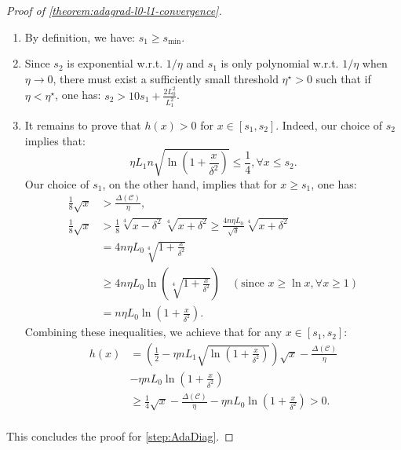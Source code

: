 \documentclass{article}
\theoremstyle{plain}
\theoremstyle{definition}
\theoremstyle{remark}
\begin{document}
\begin{proof}[Proof of \cref{theorem:adagrad-l0-l1-convergence}]
    \begin{enumerate}[leftmargin=*]
        \item By definition, we have: $s_1 \geq s_{\min}$.
        \item Since $s_2$ is exponential w.r.t. $1/\eta$ and $s_1$ is only polynomial w.r.t. $1/\eta$ when $\eta \to 0$, there must exist a sufficiently small threshold $\eta^\star > 0$ such that if $\eta < \eta^\star$, one has: $s_2 > 10 s_1 + \frac{2L_0^2}{L_1^2}$.
        \item It remains to prove that $h(x) > 0$ for $x \in [s_1, s_2]$. Indeed, our choice of $s_2$ implies that:
        \begin{equation*}
            \eta L_1 n \sqrt{\ln\left(1 + \frac{x}{\delta^2}\right)} \leq \frac{1}{4}, \forall x \leq s_2.
        \end{equation*} 
        Our choice of $s_1$, on the other hand, implies that for $x \geq s_1$, one has:
        \begin{equation*}
            \begin{aligned}
                \frac{1}{8}\sqrt{x} &> \frac{\Delta(\mathcal{C})}{\eta},\\
                \frac{1}{8}\sqrt{x} &> \frac{1}{8}\sqrt[4]{x - \delta^2}\sqrt[4]{x + \delta^2} \geq \frac{4n\eta L_0}{\sqrt{\delta}}\sqrt[4]{x + \delta^2}\\
                &= 4n\eta L_0 \sqrt[4]{1 + \frac{x}{\delta^2}}\\
                &\geq 4n\eta L_0 \ln \left(\sqrt[4]{1 + \frac{x}{\delta^2}}\right) \quad (\text{since } x \geq \ln x, \forall x \geq 1)\\
                &= n\eta L_0 \ln \left(1 + \frac{x}{\delta^2}\right).
            \end{aligned}
        \end{equation*}
        Combining these inequalities, we achieve that for any $x \in [s_1, s_2]$:
        \begin{equation*}
            \begin{aligned}
                h(x) &= \left(\frac{1}{2} - \eta n L_1 \sqrt{\ln\left(1 + \frac{x}{\delta^2}\right)}\right)\sqrt{x} - \frac{\Delta(\mathcal{C})}{\eta}\\ 
                &- \eta n L_0 \ln\left(1 + \frac{x}{\delta^2}\right)\\
                &\geq \frac{1}{4} \sqrt{x} - \frac{\Delta(\mathcal{C})}{\eta} - \eta n L_0 \ln\left(1 + \frac{x}{\delta^2}\right) > 0. \\
            \end{aligned}
        \end{equation*}
    \end{enumerate}
    This concludes the proof for \ref{step:AdaDiag}.


\end{proof}
\end{document}
